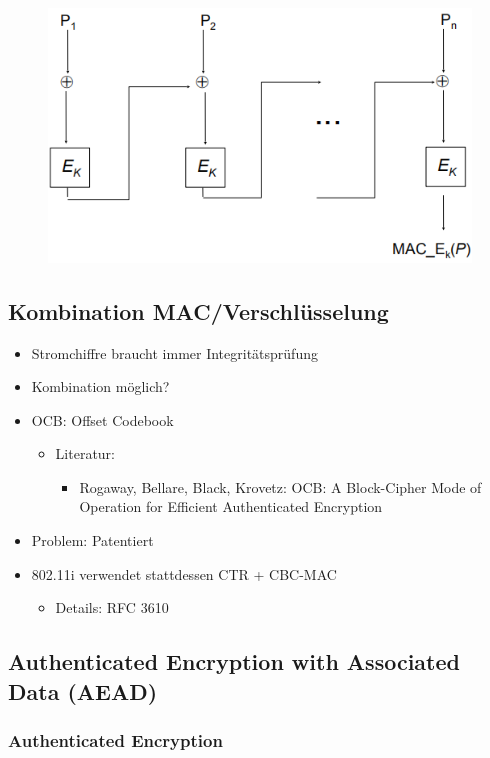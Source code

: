 \documentclass[openany]{book}
\begin{document}
\begin{figure}[h!]
    \centering
    \includegraphics[width=0.75\linewidth]{Pics/CBC-MAC.PNG}
\end{figure} 

\subsection{Kombination MAC/Verschlüsselung}

\begin{itemize}
    \item Stromchiffre braucht immer Integritätsprüfung
    \item Kombination möglich?
    \item OCB: Offset Codebook
    \begin{itemize}
        \item Literatur:
        \begin{itemize}
            \item Rogaway, Bellare, Black, Krovetz: OCB: A Block-Cipher Mode of Operation for Efficient Authenticated Encryption
        \end{itemize}
    \end{itemize}
    \item Problem: Patentiert
    \item 802.11i verwendet stattdessen CTR + CBC-MAC
    \begin{itemize}
        \item Details: RFC 3610 
    \end{itemize}
\end{itemize}

\subsection{Authenticated Encryption with Associated Data (AEAD)}

\subsubsection{Authenticated Encryption}
\end{document}
